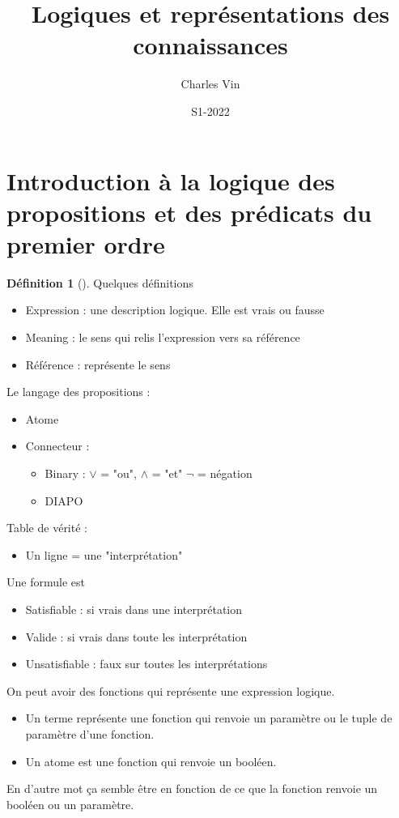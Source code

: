 \documentclass{article}
\title{Logiques et représentations des connaissances}
\author{Charles Vin}
\date{S1-2022}
\theoremstyle{plain}%
\theoremstyle{definition}
\newtheorem{defn}{Définition}[section]
\theoremstyle{remark}
\begin{document}
\maketitle

\section{Introduction à la logique des propositions et des prédicats du premier ordre}
\begin{defn}[]
    Quelques définitions
    \begin{itemize}
        \item Expression : une description logique. Elle est vrais ou fausse
        \item Meaning : le sens qui relis l'expression vers sa référence
        \item Référence : représente le sens
    \end{itemize}

    Le langage des propositions : 
    \begin{itemize}
        \item Atome 
        \item Connecteur : \begin{itemize}
            \item Binary : $ \vee $ = "ou", $\wedge$ = "et" $\neg$ = négation 
            \item DIAPO
        \end{itemize}
    \end{itemize}

    Table de vérité : \begin{itemize}
        \item Un ligne = une "interprétation"
    \end{itemize}

    Une formule est \begin{itemize}
        \item Satisfiable : si vrais dans une interprétation
        \item Valide : si vrais dans toute les interprétation
        \item Unsatisfiable : faux sur toutes les interprétations
    \end{itemize}

    On peut avoir des fonctions qui représente une expression logique. \begin{itemize}
        \item Un terme représente une fonction qui renvoie un paramètre ou le tuple de paramètre d'une fonction.
        \item Un atome est une fonction qui renvoie un booléen.
    \end{itemize}
    En d'autre mot ça semble être en fonction de ce que la fonction renvoie un booléen ou un paramètre.
    

\end{defn}
\end{document}
